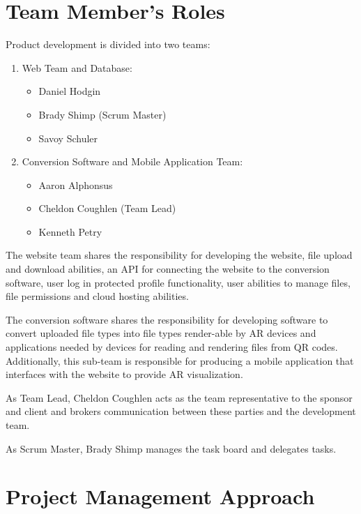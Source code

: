 
\section{Team Member's Roles}

Product development is divided into two teams:
\begin{enumerate}
    \item Web Team and Database:
        \begin{itemize}
            \item Daniel Hodgin
            \item Brady Shimp (Scrum Master)
            \item Savoy Schuler
        \end{itemize}
    \item Conversion Software and Mobile Application Team:
        \begin{itemize}
            \item Aaron Alphonsus
            \item Cheldon Coughlen (Team Lead)
            \item Kenneth Petry
        \end{itemize}
\end{enumerate}

The website team shares the responsibility for developing the website, file upload and download abilities, an API for connecting the website to the conversion software, user log in protected profile functionality, user abilities to manage files, file permissions and cloud hosting abilities.  


The conversion software shares the responsibility for developing software to convert uploaded file types into file types render-able by AR devices and applications needed by devices for reading and rendering files from QR codes.  Additionally,  this sub-team is responsible for producing a mobile application that interfaces with the website to provide AR visualization.


As Team Lead, Cheldon Coughlen acts as the team representative to the sponsor and client and brokers communication between these parties and the development team. 

As Scrum Master, Brady Shimp manages the task board and delegates tasks. 

\section{Project  Management Approach}

